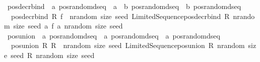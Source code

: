 \begin{isabellebody}
\isanewline
{}\isamarkupfalse%
\ pos{\isacharunderscore}{\kern0pt}decr{\isacharunderscore}{\kern0pt}bind\ {\isacharcolon}{\kern0pt}{\isacharcolon}{\kern0pt}\ {\isachardoublequoteopen}{\isacharprime}{\kern0pt}a\ pos{\isacharunderscore}{\kern0pt}random{\isacharunderscore}{\kern0pt}dseq\ {\isacharequal}{\kern0pt}{\isachargreater}{\kern0pt}\ {\isacharparenleft}{\kern0pt}{\isacharprime}{\kern0pt}a\ {\isasymRightarrow}\ {\isacharprime}{\kern0pt}b\ pos{\isacharunderscore}{\kern0pt}random{\isacharunderscore}{\kern0pt}dseq{\isacharparenright}{\kern0pt}\ {\isasymRightarrow}\ {\isacharprime}{\kern0pt}b\ pos{\isacharunderscore}{\kern0pt}random{\isacharunderscore}{\kern0pt}dseq{\isachardoublequoteclose}\isanewline
{}\isanewline
\ \ {\isachardoublequoteopen}pos{\isacharunderscore}{\kern0pt}decr{\isacharunderscore}{\kern0pt}bind\ R\ f\ {\isacharequal}{\kern0pt}\ {\isacharparenleft}{\kern0pt}{\isasymlambda}nrandom\ size\ seed{\isachardot}{\kern0pt}\ Limited{\isacharunderscore}{\kern0pt}Sequence{\isachardot}{\kern0pt}pos{\isacharunderscore}{\kern0pt}decr{\isacharunderscore}{\kern0pt}bind\ {\isacharparenleft}{\kern0pt}R\ nrandom\ size\ seed{\isacharparenright}{\kern0pt}\ {\isacharparenleft}{\kern0pt}{\isacharpercent}{\kern0pt}a{\isachardot}{\kern0pt}\ f\ a\ nrandom\ size\ seed{\isacharparenright}{\kern0pt}{\isacharparenright}{\kern0pt}{\isachardoublequoteclose}\isanewline
\isanewline
{}\isamarkupfalse%
\ pos{\isacharunderscore}{\kern0pt}union\ {\isacharcolon}{\kern0pt}{\isacharcolon}{\kern0pt}\ {\isachardoublequoteopen}{\isacharprime}{\kern0pt}a\ pos{\isacharunderscore}{\kern0pt}random{\isacharunderscore}{\kern0pt}dseq\ {\isacharequal}{\kern0pt}{\isachargreater}{\kern0pt}\ {\isacharprime}{\kern0pt}a\ pos{\isacharunderscore}{\kern0pt}random{\isacharunderscore}{\kern0pt}dseq\ {\isacharequal}{\kern0pt}{\isachargreater}{\kern0pt}\ {\isacharprime}{\kern0pt}a\ pos{\isacharunderscore}{\kern0pt}random{\isacharunderscore}{\kern0pt}dseq{\isachardoublequoteclose}\isanewline
{}\isanewline
\ \ {\isachardoublequoteopen}pos{\isacharunderscore}{\kern0pt}union\ R{}\ R{}\ {\isacharequal}{\kern0pt}\ {\isacharparenleft}{\kern0pt}{\isasymlambda}nrandom\ size\ seed{\isachardot}{\kern0pt}\ Limited{\isacharunderscore}{\kern0pt}Sequence{\isachardot}{\kern0pt}pos{\isacharunderscore}{\kern0pt}union\ {\isacharparenleft}{\kern0pt}R{}\ nrandom\ size\ seed{\isacharparenright}{\kern0pt}\ {\isacharparenleft}{\kern0pt}R{}\ nrandom\ size\ seed{\isacharparenright}{\kern0pt}{\isacharparenright}{\kern0pt}{\isachardoublequoteclose}\isanewline

\end{isabellebody}
